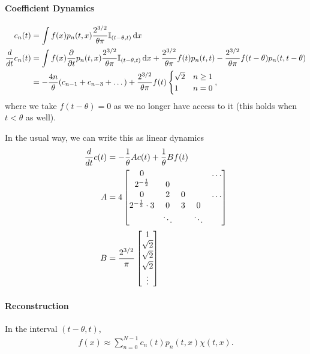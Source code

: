 \documentclass[../../hippo]{subfiles}
\begin{document}
\paragraph{Coefficient Dynamics}

\begin{align*}%
  c_n(t) &= \int f(x) p_n(t, x) \frac{2^{3/2}}{\theta\pi} \mathbb{I}_{(t-\theta, t)} \dd x
  \\
  \ddt c_n(t) &= \int f(x) \ppt p_n(t, x) \frac{2^{3/2}}{\theta\pi} \mathbb{I}_{(t-\theta, t)} \dd x + \frac{2^{3/2}}{\theta\pi} f(t)p_n(t, t) - \frac{2^{3/2}}{\theta\pi} f(t-\theta)p_n(t, t-\theta)
  \\&
  = -\frac{4n}{\theta} (c_{n-1} + c_{n-3} + \dots)  + \frac{2^{3/2}}{\theta\pi} f(t) \begin{cases} \sqrt{2} & n \geq 1 \\ 1 & n = 0 \end{cases}
  ,
\end{align*}
where we take $f(t - \theta) = 0$ as we no longer have access to it (this holds
when $t < \theta$ as well).

In the usual way, we can write this as linear dynamics
\begin{align*}
  \frac{d}{d t} c(t) &= -\frac{1}{\theta} A c(t) + \frac{1}{\theta} B f(t)
  \\
  A &=
  4
  \begin{bmatrix}
    0 & & & & \dots \\
    2^{-\frac{1}{2}} & 0 & & & \\
    0 & 2 & 0 & & \dots \\
    2^{-\frac{1}{2}} \cdot 3 & 0 & 3 & 0 & \\
    & \ddots & & \ddots &
  \end{bmatrix}
  \\
  B &=
  \frac{2^{3/2}}{\pi}
  \begin{bmatrix}
    1 \\ \sqrt{2} \\ \sqrt{2} \\ \sqrt{2} \\ \vdots
  \end{bmatrix}
\end{align*}



\paragraph{Reconstruction}
In the interval $(t-\theta, t)$,
\begin{align*}
  f(x) \approx \sum_{n=0}^{N-1} c_n(t) p_n(t, x) \chi(t, x).
\end{align*}
\end{document}
